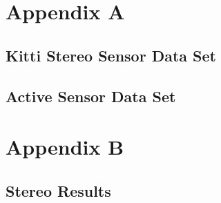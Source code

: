 \makeatletter
\chapter{Appendix A}
\label{AppendixA}

\section{Kitti Stereo Sensor Data Set}
\label{StereoSensorDataSet}



\section{Active Sensor Data Set}
\label{ActiveSensorDataSet}


\chapter{Appendix B}
\label{RawQuantitative1}

\section{Stereo Results}
\label{StereoResultsRaw}


